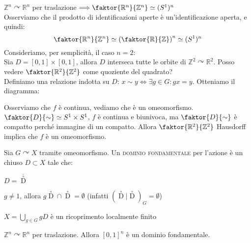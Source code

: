\begin{ex}
$\mathbb{Z}^n \curvearrowright \mathbb{R}^n$ per traslazione $\Longrightarrow \faktor {\mathbb{R}^n}{\mathbb{Z}^n} \simeq (S^1)^n$\\
Osserviamo che il prodotto di identificazioni aperte è un'identificazione aperta, e quindi:
$$\faktor {\mathbb{R}^n}{\mathbb{Z}^n} \simeq \left(\faktor {\mathbb{R}}{\mathbb{Z}}\right) ^n \simeq (S^1)^n$$
Consideriamo, per semplicità, il caso $n=2$:\\
Sia $D=[0,1] \times [0,1]$, allora $D$ interseca tutte le orbite di $\mathbb{Z}^2 \curvearrowright \mathbb{R}^2$. Posso vedere $\faktor {\mathbb{R}^2}{\mathbb{Z}^2}$ come quoziente del quadrato?\\
Definiamo una relazione indotta su $D$: $x \sim y \Longleftrightarrow \exists g \in G : gx=y$. Otteniamo il diagramma:\\
\begin{center}
\end{center}
Osserviamo che $f$ è continua, vediamo che è un omeomorfismo. \\
$\faktor {D}{\sim} \simeq S^1 \times S^1$, $f$ è continua e biunivoca, ma $\faktor {D}{\sim}$ è compatto perché immagine di un compatto. Allora $\faktor {\mathbb{R}^2}{\mathbb{Z}^2}$ Hausdorff implica che $f$ è un omeomorfismo.
\end{ex}

\begin{defn}
Sia $G \curvearrowright X$ tramite omeomorfismo. Un \textsc{dominio fondamentale} per l'azione è un chiuso $D \subset X$ tale che:
\begin{nlist}
\item $D=\overline{\mathop D\limits ^\circ}$
\item $g \neq 1$, allora $g\mathop D\limits ^\circ \cap \mathop D\limits ^\circ =\emptyset$ (infatti $(\mathop D\limits ^\circ|\mathop D\limits ^\circ)_G=\emptyset$)
\item $X=\displaystyle \bigcup _{g \in G} gD$ è un ricoprimento localmente finito
\end{nlist}
\end{defn}

\begin{ex}
$\mathbb{Z}^n \curvearrowright \mathbb{R}^n$ per traslazione. Allora $[0,1]^n$ è un dominio fondamentale.
\end{ex}

